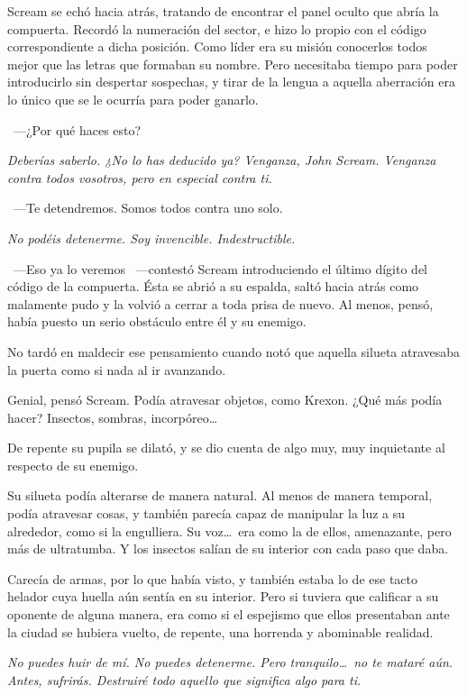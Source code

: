 Scream se echó hacia atrás, tratando de encontrar el panel oculto que abría la compuerta. Recordó la numeración del sector, e hizo lo propio con el código correspondiente a dicha posición. Como líder era su misión conocerlos todos mejor que las letras que formaban su nombre. Pero necesitaba tiempo para poder introducirlo sin despertar sospechas, y tirar de la lengua a aquella aberración era lo único que se le ocurría para poder ganarlo.

~---¿Por qué haces esto?

\emph{Deberías saberlo. ¿No lo has deducido ya? Venganza, John Scream. Venganza contra todos vosotros, pero en especial contra ti.}

~---Te detendremos. Somos todos contra uno solo.

\emph{No podéis detenerme. Soy invencible. Indestructible.}

~---Eso ya lo veremos ~---contestó Scream introduciendo el último dígito del código de la compuerta. Ésta se abrió a su espalda, saltó hacia atrás como malamente pudo y la volvió a cerrar a toda prisa de nuevo. Al menos, pensó, había puesto un serio obstáculo entre él y su enemigo.

No tardó en maldecir ese pensamiento cuando notó que aquella silueta atravesaba la puerta como si nada al ir avanzando.

Genial, pensó Scream. Podía atravesar objetos, como Krexon. ¿Qué más podía hacer? Insectos, sombras, incorpóreo\dots

De repente su pupila se dilató, y se dio cuenta de algo muy, muy inquietante al respecto de su enemigo.

Su silueta podía alterarse de manera natural. Al menos de manera temporal, podía atravesar cosas, y también parecía capaz de manipular la luz a su alrededor, como si la engulliera. Su voz\dots\ era como la de ellos, amenazante, pero más de ultratumba. Y los insectos salían de su interior con cada paso que daba.

Carecía de armas, por lo que había visto, y también estaba lo de ese tacto helador cuya huella aún sentía en su interior. Pero si tuviera que calificar a su oponente de alguna manera, era como si el espejismo que ellos presentaban ante la ciudad se hubiera vuelto, de repente, una horrenda y abominable realidad.

\emph{No puedes huir de mí. No puedes detenerme. Pero tranquilo\dots\ no te mataré aún. Antes, sufrirás. Destruiré todo aquello que significa algo para ti.}


